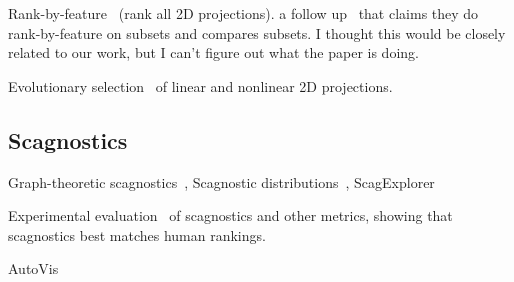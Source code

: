 Rank-by-feature~\cite{Seo2005} (rank all 2D projections). a follow up~\cite{Piringer2008} that claims they do rank-by-feature on subsets and compares subsets. I thought this would be closely related to our work, but I can't figure out what the paper is doing.

Evolutionary selection~\cite{Boukhelifa2013} of linear and nonlinear 2D projections.

\subsection{Scagnostics}
Graph-theoretic scagnostics~\cite{Wilkinson2005}, Scagnostic distributions~\cite{Wilkinson2008}, ScagExplorer~\cite{Dang2014}

Experimental evaluation~\cite{Lehmann2015} of scagnostics and other metrics, showing that scagnostics best matches human rankings.

AutoVis~\cite{Wills2010}


